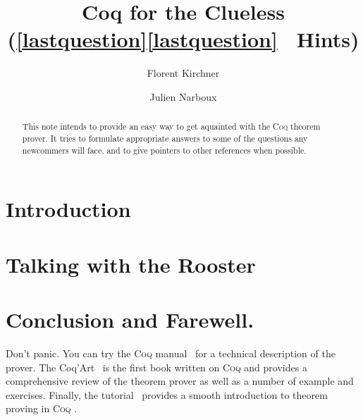 \documentclass[a4paper]{faq}
\def\Coq{\textsc{Coq }}
\begin{document}



\title{Coq for the Clueless\\
  \large(\ifpdf\ref*{lastquestion}\else\protect\ref{lastquestion}\fi
  \ Hints)
}
\author{Florent Kirchner \and Julien Narboux}
\maketitle


\begin{abstract}
This note intends to provide an easy way to get aquainted with the
\Coq theorem prover. It tries to formulate appropriate answers
to some of the questions any newcommers will face, and to give
pointers to other references when possible.
\end{abstract}


\begin{multicols}{2}
\tableofcontents
\end{multicols}


\newpage
\section{Introduction}


\section{Talking with the Rooster}				     %
\label{core}							     %

\section{Conclusion and Farewell.}
\label{ccl}

\label{lastquestion}

Don't panic. You can try the \Coq manual~\cite{Coq:e} for a technical
description of the prover. The Coq'Art~\cite{Coq:coqart} is the first
book written on \Coq and provides a comprehensive review of the
theorem prover as well as a number of example and exercises. Finally,
the tutorial~\cite{Coq:Tutorial} provides a smooth introduction to
theorem proving in \Coq.

\newpage
\nocite{LaTeX:intro}
\nocite{LaTeX:symb}



\end{document}
